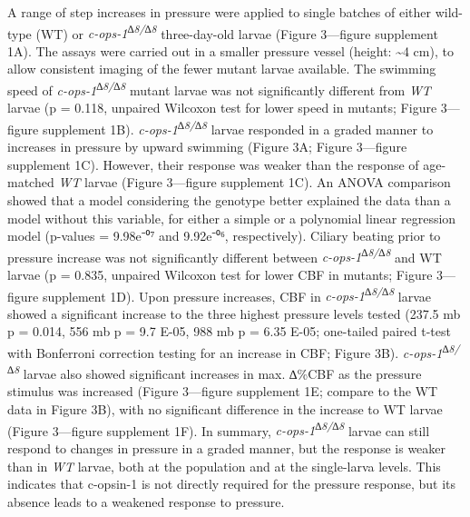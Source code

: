 \documentclass[
]{article}
\begin{document}
A range of step increases in pressure were applied to single batches of
either wild-type (WT) or \emph{c-ops-1\textsuperscript{∆8/∆8}}
three-day-old larvae (Figure 3---figure supplement 1A). The assays were
carried out in a smaller pressure vessel (height: \textasciitilde4 cm),
to allow consistent imaging of the fewer mutant larvae available. The
swimming speed of \emph{c-ops-1\textsuperscript{∆8/∆8}} mutant larvae
was not significantly different from \emph{WT} larvae (p = 0.118,
unpaired Wilcoxon test for lower speed in mutants; Figure 3---figure
supplement 1B). \emph{c-ops-1\textsuperscript{∆8/∆8}} larvae responded
in a graded manner to increases in pressure by upward swimming (Figure
3A; Figure 3---figure supplement 1C). However, their response was weaker
than the response of age-matched \emph{WT} larvae (Figure 3---figure
supplement 1C). An ANOVA comparison showed that a model considering the
genotype better explained the data than a model without this variable,
for either a simple or a polynomial linear regression model (p-values =
9.98e⁻⁰⁷ and 9.92e⁻⁰⁶, respectively). Ciliary beating prior to pressure
increase was not significantly different between
\emph{c-ops-1\textsuperscript{∆8/∆8}} and WT larvae (p = 0.835, unpaired
Wilcoxon test for lower CBF in mutants; Figure 3---figure supplement
1D). Upon pressure increases, CBF in
\emph{c-ops-1\textsuperscript{∆8/∆8}} larvae showed a significant
increase to the three highest pressure levels tested (237.5 mb p =
0.014, 556 mb p = 9.7 E-05, 988 mb p = 6.35 E-05; one-tailed paired
t-test with Bonferroni correction testing for an increase in CBF; Figure
3B). \emph{c-ops-1\textsuperscript{∆8/∆8}} larvae also showed
significant increases in max. ∆\%CBF as the pressure stimulus was
increased (Figure 3---figure supplement 1E; compare to the WT data in
Figure 3B), with no significant difference in the increase to WT larvae
(Figure 3---figure supplement 1F). In summary,
\emph{c-ops-1\textsuperscript{∆8/∆8}} larvae can still respond to
changes in pressure in a graded manner, but the response is weaker than
in \emph{WT} larvae, both at the population and at the single-larva
levels. This indicates that c-opsin-1 is not directly required for the
pressure response, but its absence leads to a weakened response to
pressure.
\end{document}
